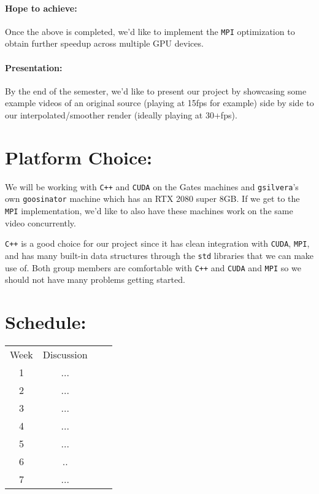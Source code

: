 \documentclass[12pt]{article}
\begin{document}
\paragraph{Hope to achieve:}
\par Once the above is completed, we'd like to implement the \texttt{MPI} optimization to obtain further speedup across multiple GPU devices. 
\paragraph{Presentation:}
\par By the end of the semester, we'd like to present our project by showcasing some example videos of an original source (playing at 15fps for example) side by side to our interpolated/smoother render (ideally playing at 30+fps).

\section*{Platform Choice:}
\par We will be working with \texttt{C++} and \texttt{CUDA} on the Gates machines and \texttt{gsilvera}'s own \texttt{goosinator} machine which has an RTX 2080 super 8GB. If we get to the \texttt{MPI} implementation, we'd like to also have these machines work on the same video concurrently. 
\par \texttt{C++} is a good choice for our project since it has clean integration with \texttt{CUDA}, \texttt{MPI}, and has many built-in data structures through the \texttt{std} libraries that we can make use of. Both group members are comfortable with \texttt{C++} and \texttt{CUDA} and \texttt{MPI} so we should not have many problems getting started.  

\section*{Schedule:}
\begin{tabular}{ |c|c|c|c| } 
	\hline
	Week & Discussion \\
	1 & ...\\ 
	2 & ...\\
	3 & ...\\
	4 & ...\\
	5 & ...\\
	6 & ..\\
	7 & ...\\
	\hline
\end{tabular}\\
\end{document}
